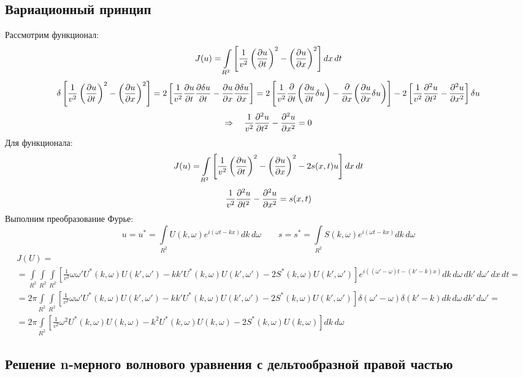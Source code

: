 \subsection{Вариационный принцип}

Рассмотрим функционал:
\[
	J(u) = \int\limits_{R^2} \left[\frac{1}{v^2} \left(\frac{\partial u}{\partial t}\right)^2 - \left(\frac{\partial u}{\partial x}\right)^2 \right] dx\, dt  
\]
\[
	\begin{gathered}
	\delta \left[\frac{1}{v^2} \left(\frac{\partial u}{\partial t}\right)^2 - \left(\frac{\partial u}{\partial x}\right)^2 \right] = 
	2 \left[\frac{1}{v^2} \frac{\partial u}{\partial t} \frac{\partial \delta u}{\partial t}  - \frac{\partial u}{\partial x} \frac{\partial \delta u}{\partial x} \right] =
	2 \left[\frac{1}{v^2} \cfrac{\partial}{\partial t} \left(\frac{\partial u}{\partial t} \delta u \right)  - \cfrac{\partial}{\partial x} \left(\frac{\partial u}{\partial x} \delta u \right) \right] -
	2 \left[\frac{1}{v^2} \frac{\partial^2 u}{\partial t^2} - \frac{\partial^2 u}{\partial x^2}\right] \delta u
	\end{gathered}
\]
\[
	\Rightarrow \quad \frac{1}{v^2} \frac{\partial^2 u}{\partial t^2} - \frac{\partial^2 u}{\partial x^2} = 0
\]
Для функционала:
\[
	J(u) = \int\limits_{R^2} \left[\frac{1}{v^2} \left(\frac{\partial u}{\partial t}\right)^2 - \left(\frac{\partial u}{\partial x}\right)^2 - 2 s(x, t) u \right] dx\, dt
\]
\[
	\frac{1}{v^2} \frac{\partial^2 u}{\partial t^2} - \frac{\partial^2 u}{\partial x^2} = s(x, t)
\]
Выполним преобразование Фурье:
\[
	u = u^* = \int\limits_{R^2} U(k, \omega) e^{i(\omega t - k x)} dk\, d\omega
	\qquad
	s = s^* = \int\limits_{R^2} S(k, \omega) e^{i(\omega t - k x)} dk\, d\omega
\]
\[
	\begin{gathered}
	J(U) = 
	\\ =
	\int\limits_{R^2} 
	\int\limits_{R^2}
	\int\limits_{R^2}
	\left[\frac{1}{v^2} \omega \omega' U^*(k, \omega) U(k', \omega') - k k' U^*(k, \omega) U(k', \omega') - 2 S^*(k, \omega) U(k', \omega') \right]
	e^{i((\omega' - \omega) t - (k' - k) x)}  dk\, d\omega\, dk'\, d\omega'\, dx\, dt
	=
	\\ =
	2\pi 
	\int\limits_{R^2} 
	\int\limits_{R^2}
	\left[\frac{1}{v^2} \omega \omega' U^*(k, \omega) U(k', \omega') - k k' U^*(k, \omega) U(k', \omega') - 2 S^*(k, \omega) U(k', \omega') \right]
	\delta(\omega' - \omega) \delta(k' - k) dk\, d\omega\, dk'\, d\omega'
	=
	\\ =
	2\pi 
	\int\limits_{R^2} 
	\left[\frac{1}{v^2} \omega^2 U^*(k, \omega) U(k, \omega) - k^2 U^*(k, \omega) U(k, \omega) - 2 S^*(k, \omega) U(k, \omega) \right]
	dk\, d\omega
	\end{gathered}
\]

\subsection{Решение n-мерного волнового уравнения с дельтообразной правой частью}

